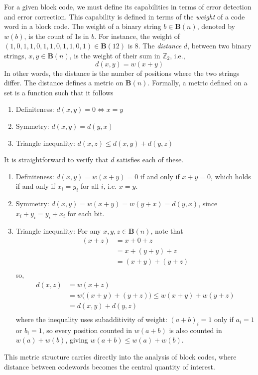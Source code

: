 \documentclass{article}
\begin{document}
For a given block code, we must define its capabilities in terms of error detection and error
correction. This capability is defined in terms of the \textit{weight} of a code word in a 
block code. The weight of a binary string \(b \in \mathbf{B}(n)\), denoted by \(w(b)\), is the count of
1s in \(b\). For instance, the weight of \((1,0,1,1,0,1,1,0,1,1,0,1) \in \mathbf{B}(12)\) is 8.
The \textit{distance} \(d\), between two binary strings, \(x , y \in \mathbf{B}(n)\), is the weight of their 
sum in \(\mathbb{Z}_2\), i.e., 
\[d(x, y) = w(x + y)\]
In other words, the distance is the number of positions where the two strings differ.
The distance defines a metric \parencite{hamming1950error} on \(\mathbf{B}(n)\). Formally, a metric defined on a 
set is a function such that it follows
\begin{enumerate}
\item Definiteness: \(d(x, y) = 0 \iff x = y\)
\item Symmetry: \(d(x, y) = d(y, x)\)
\item Triangle inequality: \(d(x, z) \leq d(x, y) + d(y, z)\)
\end{enumerate}
It is straightforward to verify that \(d\) satisfies each of these.
\begin{enumerate}
    \item Definiteness: \(d(x,y) = w(x + y) = 0\) if and only if \(x + y = 0\), which holds 
        if and only if \(x_i = y_i\) for all \(i\), i.e. \(x = y\).

    \item Symmetry: \(d(x,y) = w(x + y) = w(y + x) = d(y,x)\), since \(x_i + y_i = y_i 
        + x_i\) for each bit.

    \item Triangle inequality: For any \(x, y, z \in \mathbf{B}(n)\), note that
        \begin{align*}
            (x + z) &= x + 0 + z \\
                    &= x + (y + y) + z \\
                    &= (x + y) + (y + z) \\
        \end{align*}
        so,
        \begin{align*}
            d(x,z) &= w(x+ z) \\
                   &= w\bigl((x + y)+(y + z)\bigr) \leq w(x + y) + w(y + z) \\
                   &= d(x,y)+d(y,z) \\
        \end{align*}
        where the inequality uses subadditivity of weight: \((a + b)_i = 1\) only if \(a_i = 1\) or \(b_i = 1\),
        so every position counted in \(w(a + b)\) is also counted in \(w(a) + w(b)\), giving \(w(a + b) \leq w(a) + w(b)\).
\end{enumerate}
This metric structure carries directly into the analysis of block codes, where distance between codewords
becomes the central quantity of interest.
\end{document}
